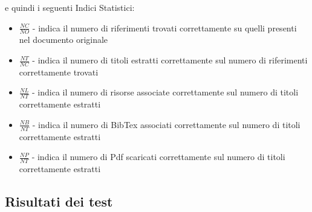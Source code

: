 e quindi i seguenti Indici Statistici:
\begin{itemize}
 \item \textbf{$\frac{NC}{NO}$} - indica il numero di riferimenti trovati correttamente su quelli presenti nel documento originale
 \item \textbf{$\frac{NT}{NC}$} - indica il numero di titoli estratti correttamente sul numero di riferimenti correttamente trovati
 \item \textbf{$\frac{NL}{NT}$} - indica il numero di risorse associate correttamente sul numero di titoli correttamente estratti
 \item \textbf{$\frac{NB}{NT}$} - indica il numero di BibTex associati correttamente sul numero di titoli correttamente estratti
 \item \textbf{$\frac{NP}{NT}$} - indica il numero di Pdf scaricati correttamente sul numero di titoli correttamente estratti
\end{itemize}

\subsection{Risultati dei test}


